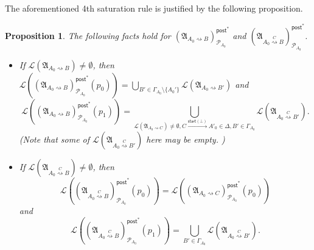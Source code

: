 \documentclass[preprint,12pt]{elsarticle}
\newtheorem{proposition}[theorem]{Proposition}
\newcommand\Pp{{\mathcal{P} }}
\newcommand\startactivity{{\mathsf{start} }}
\newcommand\post{{\mathsf{post} }}
\newcommand\Aut{{\mathfrak{A} }}
\newcommand\Lang{{\mathscr{L} }}
\begin{document}
 

The aforementioned 4th saturation rule is justified by the following proposition. 

\begin{proposition} \label{prop-lm-A0-post}
The following facts hold for $(\Aut_{A_0 \rightsquigarrow B})^{\post^*}_{\Pp_{A_0}}$ and $(\Aut_{A_0\stackrel{C}\rightsquigarrow B})^{\post^*}_{\Pp_{A_0}}$.
\begin{itemize}
    \item If $ \Lang(\Aut_{A_0 \rightsquigarrow B}) \neq \emptyset$, then $\Lang((\Aut_{A_0 \rightsquigarrow B})^{\post^*}_{\Pp_{A_0}}(p_0)) = \bigcup\limits_{B' \in \Gamma_{A_0}\setminus\{A_0'\}} \Lang(\Aut_{A_0\rightsquigarrow B'})$ and
    $$\Lang((\Aut_{A_0 \rightsquigarrow B})^{\post^*}_{\Pp_{A_0}}(p_1))  = \bigcup\limits_{\Lang(\Aut_{A_0\rightsquigarrow C})\neq\emptyset,C \xrightarrow{\startactivity(\bot)}A'_0 \in \Delta, B' \in \Gamma_{A_0}} \Lang(\Aut_{A_0\stackrel{C}\rightsquigarrow B'}).$$
        (Note that some of $\Lang(\Aut_{A_0\stackrel{C}\rightsquigarrow B'})$ here may be empty. ) 
%

%
    \item If $ \Lang(\Aut_{A_0\stackrel{C}\rightsquigarrow B}) \neq \emptyset$, then 
    $$\Lang((\Aut_{A_0\stackrel{C}\rightsquigarrow B})^{\post^*}_{\Pp_{A_0}}(p_0)) = \Lang((\Aut_{A_0 \rightsquigarrow C})^{\post^*}_{\Pp_{A_0}}(p_0))$$ 
    and 
    $$\Lang((\Aut_{A_0\stackrel{C}\rightsquigarrow B})^{\post^*}_{\Pp_{A_0}}(p_1)) = 
    \bigcup\limits_{B'\in\Gamma_{A_0}}\Lang(\Aut_{A_0\stackrel{C}\rightsquigarrow B'}).$$
\end{itemize}
\end{proposition}
\end{document}
